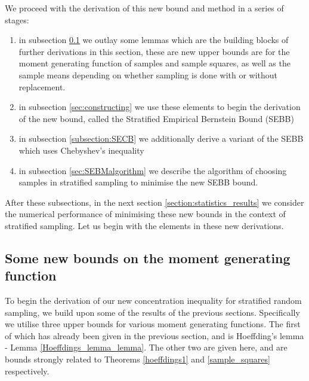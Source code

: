 We proceed with the derivation of this new bound and method in a series of stages:
\begin{enumerate}
\item	in subsection \ref{subsection:new_bounds} we outlay some lemmas which are the building blocks of further derivations in this section, these are new upper bounds are for the moment generating function of samples and sample squares, as well as the sample means depending on whether sampling is done with or without replacement.
\item	in subsection \ref{sec:constructing} we use these elements to begin the derivation of the new bound, called the Stratified Empirical Bernstein Bound (SEBB)
\item	in subsection \ref{subsection:SECB} we additionally derive a variant of the SEBB which uses Chebyshev's inequality
\item	in subsection \ref{sec:SEBMalgorithm} we describe the algorithm of choosing samples in stratified sampling to minimise the new SEBB bound.
\end{enumerate}

After these subsections, in the next section \ref{section:statistics_results} we consider the numerical performance of minimising these new bounds in the context of stratified sampling.
Let us begin with the elements in these new derivations.
\DIFaddbegin {}\DIFaddend 


\subsection{Some new bounds on the moment generating function}\label{subsection:new_bounds}

To begin the derivation of our new concentration inequality for stratified random sampling, we build upon some of the results of the previous sections.
Specifically we utilise three upper bounds for various moment generating functions.
The first of which has already been given in the previous section, and is Hoeffding's lemma - Lemma \ref{Hoeffdings_lemma_lemma}.
The other two are given here, and are bounds strongly related to Theorems \ref{hoeffdings1} and \ref{sample_squares} respectively.

